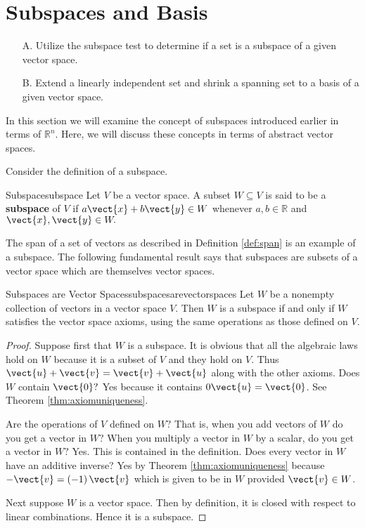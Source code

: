 \section{Subspaces and Basis}

\begin{outcome}
\begin{enumerate}
\item[A.] Utilize the subspace test to determine if a set is a subspace of a given vector space.

\item[B.] Extend a linearly independent set and shrink a spanning set to a basis of a given vector space. 
\end{enumerate}
\end{outcome}

In this section we will examine the concept of subspaces introduced earlier in terms of $\mathbb{R}^n$. Here, we will discuss these concepts in terms of abstract vector spaces. 

Consider the definition of a subspace.

\begin{definition}{Subspace}{subspace}
Let $V$ be a vector space. A subset $W\subseteq V$ is said to be a \textbf{subspace} of $V$ if $a\vect{x}+b\vect{y}
\in W$ whenever $a,b\in \mathbb{R}$ and $\vect{x},\vect{y}\in W.$
\end{definition}

The span of a set of vectors as described in Definition \ref{def:span} is an example of a subspace. The following fundamental result says that subspaces are subsets of a
vector space which are themselves vector spaces.

\begin{theorem}{Subspaces are Vector Spaces}{subspacesarevectorspaces}
Let $W$ be a nonempty collection of vectors in a vector space $V$. Then $W$
is a subspace if and only if $W$ satisfies the vector space axioms, using the same
operations as those defined on $V$.
\end{theorem}

\begin{proof}
Suppose first that $W$ is a subspace. It is obvious that
all the algebraic laws hold on $W$ because it is a subset of $V$ and they
hold on $V$. Thus $\vect{u}+\vect{v}=\vect{v}+\vect{u}$ along with the other axioms. Does $W$
contain $\vect{0}?$ Yes because it contains $0\vect{u}=\vect{0}$. See
Theorem \ref{thm:axiomuniqueness}.

 Are the operations of $V$ defined on $W?$ That is,
when you add vectors of $W$ do you get a vector in $W?$ When you multiply a
vector in $W$ by a scalar, do you get a vector in $W?$ Yes. This is
contained in the definition. Does every vector in $W$ have an additive
inverse? Yes by Theorem \ref{thm:axiomuniqueness} because $-\vect{v}=\left(
-1\right) \vect{v}$ which is given to be in $W$ provided $\vect{v}\in W$.

Next suppose $W$ is a vector space. Then by definition, it is closed with
respect to linear combinations. Hence it is a subspace. 
\end{proof}

